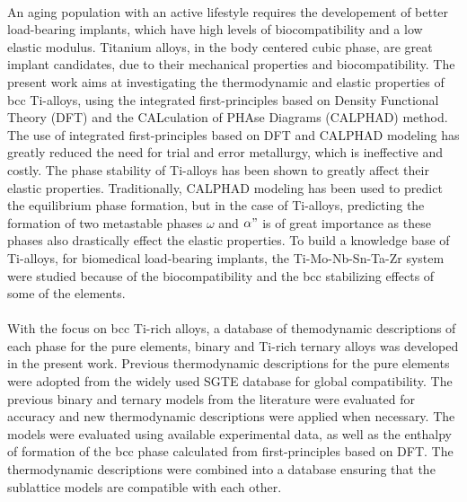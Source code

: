 \paragraph*{} An aging population with an active lifestyle requires the developement of better load-bearing implants, which have high levels of biocompatibility and a low elastic modulus. Titanium alloys, in the body centered cubic phase, are great implant candidates, due to their mechanical properties and biocompatibility. The present work aims at investigating the thermodynamic and elastic properties of bcc Ti-alloys, using the integrated first-principles based on Density Functional Theory (DFT) and the CALculation of PHAse Diagrams (CALPHAD) method. The use of integrated first-principles based on DFT and CALPHAD modeling has greatly reduced the need for trial and error metallurgy, which is ineffective and costly. The phase stability of Ti-alloys has been shown to greatly affect their elastic properties. Traditionally, CALPHAD modeling has been used to predict the equilibrium phase formation, but in the case of Ti-alloys, predicting the formation of two metastable phases $\omega$ and $\alpha"$ is of great importance as these phases also drastically effect the elastic properties. To build a knowledge base of Ti-alloys, for biomedical load-bearing implants, the Ti-Mo-Nb-Sn-Ta-Zr system were studied because of the biocompatibility and the bcc stabilizing effects of some of the elements.
\paragraph*{} With the focus on bcc Ti-rich alloys, a database of themodynamic descriptions of each phase for the pure elements, binary and Ti-rich ternary alloys was developed in the present work. Previous thermodynamic descriptions for the pure elements were adopted from the widely used SGTE database for global compatibility. The previous binary and ternary models from the literature were evaluated for accuracy and new thermodynamic descriptions were applied when necessary. The models were evaluated using available experimental data, as well as the enthalpy of formation of the bcc phase calculated from first-principles based on DFT. The thermodynamic descriptions were combined into a database ensuring that the sublattice models are compatible with each other.
